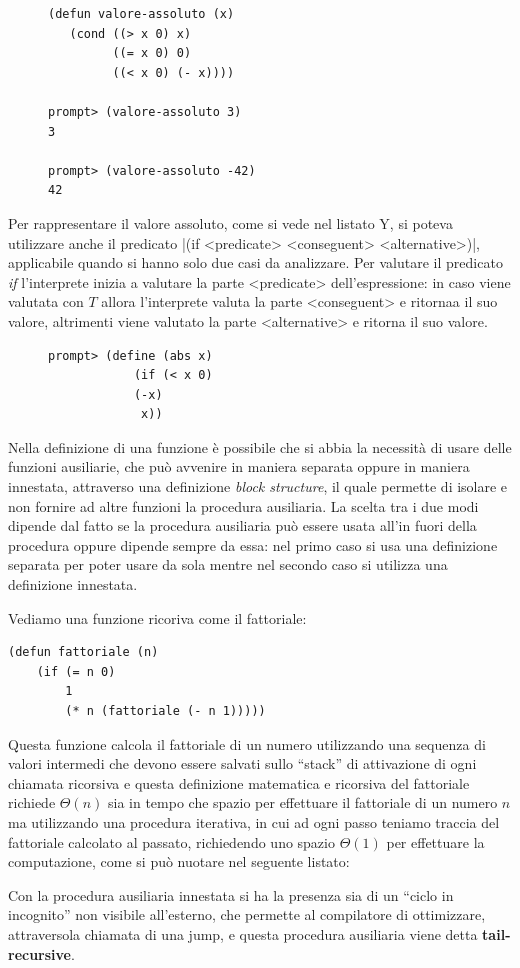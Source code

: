 \documentclass[a4paper]{book}
\begin{document}
\begin{figure}
\begin{verbatim}
(defun valore-assoluto (x)
   (cond ((> x 0) x)
         ((= x 0) 0)
         ((< x 0) (- x))))

prompt> (valore-assoluto 3)
3

prompt> (valore-assoluto -42)
42
\end{verbatim}
\end{figure}
Per rappresentare il valore assoluto, come si vede nel listato Y, si poteva utilizzare anche il predicato 
|(if <predicate> <conseguent> <alternative>)|, applicabile quando si hanno solo due casi da analizzare.\newline
Per valutare il predicato \emph{if} l'interprete inizia a valutare la parte <predicate> dell'espressione: in caso viene valutata con $T$
allora l'interprete valuta la parte <conseguent> e ritornaa il suo valore, altrimenti viene valutato la parte <alternative> e ritorna il suo valore.

\begin{figure}
\begin{verbatim}
prompt> (define (abs x)
            (if (< x 0)
            (-x)
             x))
\end{verbatim}
\end{figure}
Nella definizione di una funzione è possibile che si abbia la necessità di usare delle funzioni ausiliarie, che può avvenire in maniera separata
oppure in maniera innestata, attraverso una definizione \emph{block structure}, il quale permette di isolare e non fornire ad altre funzioni
la procedura ausiliaria.\newline
La scelta tra i due modi dipende dal fatto se la procedura ausiliaria può essere usata all'in fuori della procedura oppure dipende sempre da essa:
nel primo caso si usa una definizione separata per poter usare da sola mentre nel secondo caso si utilizza una definizione innestata.

Vediamo una funzione ricoriva come il fattoriale:
\begin{verbatim}
(defun fattoriale (n)
    (if (= n 0)
        1
        (* n (fattoriale (- n 1)))))
\end{verbatim}
Questa funzione calcola il fattoriale di un numero utilizzando una sequenza di valori intermedi che devono essere salvati sullo ``stack''
di attivazione di ogni chiamata ricorsiva e questa definizione matematica e ricorsiva del fattoriale richiede $\Theta(n)$ sia in tempo che spazio
per effettuare il fattoriale di un numero $n$ ma utilizzando una procedura iterativa, in cui ad ogni passo teniamo traccia del fattoriale
calcolato al passato, richiedendo uno spazio $\Theta(1)$ per effettuare la computazione, come si può nuotare nel seguente listato:
\begin{figure}
\end{figure}
Con la procedura ausiliaria innestata  si ha la presenza sia di un ``ciclo in incognito'' non visibile all'esterno, che permette al compilatore di
ottimizzare, attraversola chiamata di una jump, e questa procedura ausiliaria viene detta \textbf{tail-recursive}.
\end{document}

